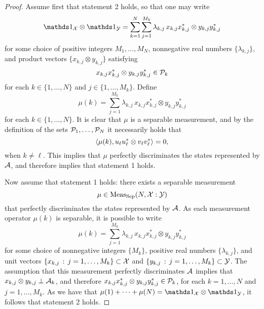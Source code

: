 \begin{proof}
  Assume first that statement 2 holds, so that one may write
  \begin{equation}
    \I_{\X}\otimes\I_{\Y} =
    \sum_{k = 1}^N \sum_{j = 1}^{M_k} \lambda_{k,j}\,
    x_{k,j} x_{k,j}^{\ast}\otimes y_{k,j} y_{k,j}^{\ast}
  \end{equation}
  for some choice of positive integers $M_1,\ldots,M_N$, nonnegative real
  numbers $\{\lambda_{k,j}\}$, and product vectors
  $\{x_{k,j} \otimes y_{k,j}\}$ satisfying
  \begin{equation}
    x_{k,j} x_{k,j}^{\ast}\otimes y_{k,j} y_{k,j}^{\ast} \in \P_k
  \end{equation}
  for each $k\in\{1,\ldots,N\}$ and $j \in \{1,\ldots,M_k\}$.
  Define
  \begin{equation} \label{eq:P_k-enumeration}
    \mu(k) = \sum_{j = 1}^{M_k} \lambda_{k,j}\,
    x_{k,j} x_{k,j}^{\ast}\otimes y_{k,j} y_{k,j}^{\ast}
  \end{equation}
  for each $k\in\{1,\ldots,N\}$.
  It is clear that $\mu$ is a separable measurement, and by the
  definition of the sets $\P_1,\ldots,\P_N$ it necessarily holds that
  \begin{equation}
    \ip{\mu(k)}{u_\ell u_\ell^* \otimes v_\ell v_\ell^*} = 0,
  \end{equation}
  when $k\not=\ell$.
  This implies that $\mu$ perfectly discriminates the states
  represented by $\A$, and therefore implies that statement 1 holds.
  
  Now assume that statement 1 holds: there exists a separable measurement
  \[\mu \in \Meas_{\Sep}(N, \X:\Y)\] 
  that perfectly discriminates the states represented by $\A$.
  As each measurement operator $\mu(k)$ is separable, it is possible to write
  \begin{equation}
    \mu(k) = \sum_{j = 1}^{M_k} \lambda_{k,j}\,
    x_{k,j} x_{k,j}^{\ast}\otimes y_{k,j} y_{k,j}^{\ast}
  \end{equation}
  for some choice of nonnegative integers $\{M_k\}$, positive real numbers
  $\{\lambda_{k,j}\}$, and unit vectors
  $\{x_{k,j}\,:\,j=1,\ldots,M_k\}\subset\X$ and 
  $\{y_{k,j}\,:\,j=1,\ldots,M_k\}\subset\Y$.
  The assumption that this measurement perfectly discriminates $\A$ implies that
  $x_{k,j}\otimes y_{k,j} \perp \A_k$, and therefore
  $x_{k,j} x_{k,j}^{\ast} \otimes y_{k,j} y_{k,j}^{\ast} \in \P_k$, for each
  $k = 1,\ldots,N$ and $j = 1,\ldots,M_k$.
  As we have that $\mu(1)+\cdots+\mu(N) = \I_{\X} \otimes \I_{\Y}$, it follows that statement 2
  holds.
\end{proof}

